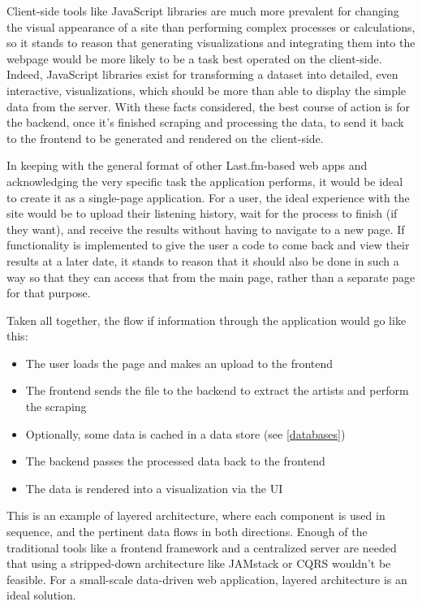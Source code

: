 Client-side tools like JavaScript libraries are much more prevalent for changing the visual appearance of a site than performing complex processes or calculations, so it stands to reason that generating visualizations and integrating them into the webpage would be more likely to be a task best operated on the client-side. Indeed, JavaScript libraries exist for transforming a dataset into detailed, even interactive, visualizations, which should be more than able to display the simple data from the server. With these facts considered, the best course of action is for the backend, once it's finished scraping and processing the data, to send it back to the frontend to be generated and rendered on the client-side.

In keeping with the general format of other Last.fm-based web apps and acknowledging the very specific task the application performs, it would be ideal to create it as a single-page application. For a user, the ideal experience with the site would be to upload their listening history, wait for the process to finish (if they want), and receive the results without having to navigate to a new page. If functionality is implemented to give the user a code to come back and view their results at a later date, it stands to reason that it should also be done in such a way so that they can access that from the main page, rather than a separate page for that purpose. 

Taken all together, the flow if information through the application would go like this: 

\begin{itemize}
	\item The user loads the page and makes an upload to the frontend
	\item The frontend sends the file to the backend to extract the artists and perform the scraping
	\item Optionally, some data is cached in a data store (see \autoref{databases})
	\item The backend passes the processed data back to the frontend
	\item The data is rendered into a visualization via the UI
\end{itemize}

This is an example of layered architecture, where each component is used in sequence, and the pertinent data flows in both directions. Enough of the traditional tools like a frontend framework and a centralized server are needed that using a stripped-down architecture like JAMstack or CQRS wouldn't be feasible. For a small-scale data-driven web application, layered architecture is an ideal solution.


